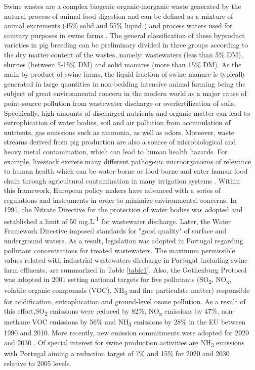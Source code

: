Swine wastes are a complex biogenic organic-inorganic waste generated by the natural process of animal food digestion and can be defined as a mixture of animal excrements (45\% solid and 55\% liquid \cite{Villamar_2011}) and process waters used for sanitary purposes in swine farms \cite{Vassilev_2013,Marszaek2014}. The general classification of these byproduct varieties in pig breeding can be preliminary divided in three groups according to the dry matter content of the wastes, namely: wastewaters (less than 5\% DM), slurries (between 5-15\% DM) and solid manures (more than 15\% DM). As the main by-product of swine farms, the liquid fraction of swine manure is typically generated in large quantities in non-bedding intensive animal farming being the subject of great environmental concern in the modern world as a major cause of point-source pollution from wastewater discharge or overfertilization of soils. Specifically, high amounts of discharged nutrients and organic matter can lead to eutrophication of water bodies, soil and air pollution from accumulation of nutrients, gas emissions such as ammonia, as well as odors. Moreover, waste streams derived from pig production are also a source of microbiological and heavy metal contamination, which can lead to human health hazards. For example, livestock excrete many different pathogenic microorganisms of relevance to human health which can be water-borne or food-borne and enter human food chain through agricultural contamination in many irrigation systems \cite{Andersson2013}. Within this framework, European policy makers have advanced with a series of regulations and instruments in order to minimize environmental concerns. In 1991, the Nitrate Directive \cite{CounciloftheEuropeanCommunities1991} for the protection of water bodies was adopted and established a limit of 50 mg.L\textsuperscript{-1} for wastewater discharge. Later, the Water Framework Directive \cite{EuropeanParliament2000} imposed standards for "good quality" of surface and underground waters. As a result, legislation was adopted in Portugal regarding pollutant concentrations for treated wastewaters. The maximum permissible values related with industrial wastewaters discharge in Portugal\, including swine farm effluents, are summarized in Table \ref{table1}. Also, the Gothenburg Protocol \cite{EuropeanParliament2001} was adopted in 2001 setting national targets for five pollutants (SO\textsubscript{2}, NO\textsubscript{x}, volatile organic compounds (VOC), NH\textsubscript{3} and fine particulate matter) responsible for acidification, eutrophication and ground-level ozone pollution. As a result of this effort,SO\textsubscript{2} emissions were reduced by 82\%, NO\textsubscript{x} emissions by 47\%, non-methane VOC emissions by 56\% and NH\textsubscript{3} emissions by 28\% in the EU between 1990 and 2010. More recently, new emission commitments were adopted for 2020 and 2030 \cite{EuropeanParliament2016}. Of special interest for swine production activities are NH\textsubscript{3} emissions with Portugal aiming a reduction target of 7\% and 15\% for 2020 and 2030 relative to 2005 levels.

